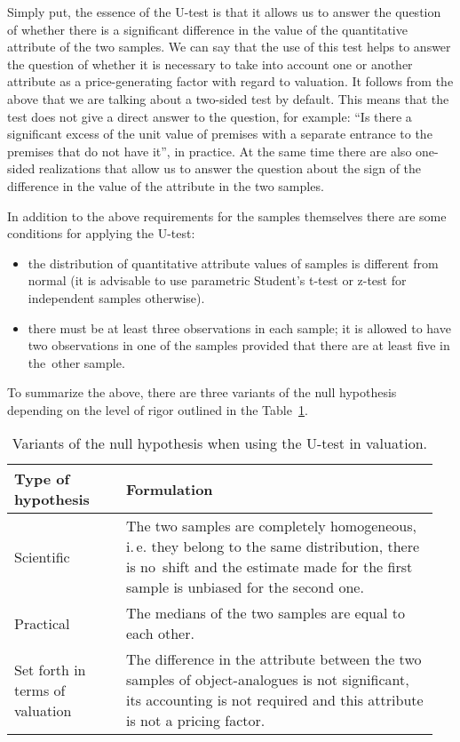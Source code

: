 \documentclass[]{scrreprt}
\begin{document}
Simply put, the essence of the U-test is that it allows us to answer the question of whether there is a significant difference in the value of the quantitative attribute of the two samples. We can say that the use of this test helps to answer the question of whether it is necessary to take into account one or another attribute as a price-generating factor with regard to valuation. It follows from the above that we are talking about a two-sided test by default. This means that the test does not give a direct answer to the question, for example: ``Is there a significant excess of the unit value of premises with a separate entrance to the premises that do not have it'', in practice. At the same time there are also one-sided realizations that allow us to answer the question about the sign of the difference in the value of the attribute in the two samples.

In addition to the above requirements for the samples themselves there are some conditions for applying the U-test:
\begin{itemize}
	\item the distribution of quantitative attribute values of samples is different from normal (it is advisable to use parametric Student's t-test or z-test for independent samples otherwise).
	\item there must be at least three observations in each sample; it is allowed to have two observations in one of the samples provided that there are at least five in the~other sample.
\end{itemize}
To summarize the above, there are three variants of the null hypothesis depending on the level of rigor outlined in the Table~\ref{tab:nul-hypothesis-variants}.
\begin{table}[htp]
	\caption{Variants of the null hypothesis when using the U-test in valuation.}\label{tab:nul-hypothesis-variants}
	\centering
	\begin{tabularx}{\textwidth}{p{0.25\linewidth} p{0.7\linewidth}} 
		\hline
		Type of hypothesis&Formulation\\
		\hline
		Scientific&The two samples are completely homogeneous, i.\,e. they belong to the same distribution, there is no~shift and the estimate made for the first sample is unbiased for the second one.\\
		\hline
		Practical&The medians of the two samples are equal to each other.\\
		\hline
		Set forth in terms of valuation&The difference in the attribute between the two samples of object-analogues is not significant, its accounting is not required and this attribute is not a pricing factor.\\
		\hline
	\end{tabularx}
\end{table}
%
\end{document}
